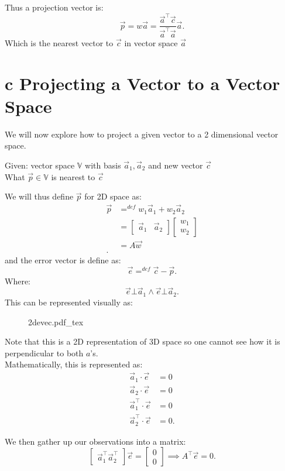 \documentclass[12pt]{book}
\newcommand{\incfig}[1]{%
    {#1.pdf_tex}
}
\begin{document}
Thus a projection vector is:
\[
\vec p = w\vec a = \frac{\vec a^\top \vec c}{\vec a^\top \vec a}\vec a
.\] 
Which is the nearest vector to $\vec c$ in vector space  $\vec a$

\section*{c Projecting a Vector to a Vector Space}
We will now explore how to project a given vector to a 2 dimensional vector space.

Given: vector space $ \mathbb{V} $ with basis  $\vec a_1, \vec a_2$ and new vector $\vec c$ \\
What $\vec p \in \mathbb{V}$ is nearest to  $\vec c$
\pagebreak

We will thus define $\vec p$ for 2D space as:
\begin{align*}
        \vec p &=^{def} w_1\vec a_1 + w_2\vec a_2 \\
               &= \begin{bmatrix} \vec a_1 & \vec a_2 \end{bmatrix} \begin{bmatrix} w_1\\w_2 \end{bmatrix} \\
               &=  A\vec w\\
.\end{align*}
and the error vector is define as:
\[
\vec e =^{def} \vec c- \vec p
.\] 
Where:
\[
\vec e \bot \vec a_1 \wedge \vec e \bot \vec a_2
.\] 
This can be represented visually as:
\begin{figure}[h]
        \centering
        \incfig{2devec}
\end{figure}
Note that this is a 2D representation of 3D space so one cannot see how it is perpendicular to both $a$'s.\\ 
Mathematically, this is represented as:
\begin{align*}
        \vec a_1 \cdot \vec e &= 0\\
        \vec a_2 \cdot \vec e &= 0\\
        \vec a_1^\top \cdot \vec e &= 0\\
        \vec a_2^\top \cdot \vec e &= 0
.\end{align*}

We then gather up our observations into a matrix:
\[
\begin{bmatrix} \vec a_1^\top \vec a_2^\top \end{bmatrix} \vec e = \begin{bmatrix} 0\\0 \end{bmatrix}\implies A^\top\vec e = 0 
.\] 
\end{document}
